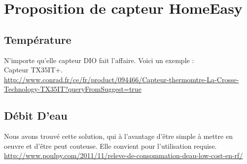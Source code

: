 \documentclass[10pt,a4paper]{article}
\begin{document}
\section{Proposition de capteur HomeEasy}
\subsection{Température}
N'importe qu'elle capteur DIO fait l'affaire. Voici un exemple :\\
Capteur TX35IT+.\\
\url{http://www.conrad.fr/ce/fr/product/094466/Capteur-thermomtre-La-Crosse-Technology-TX35IT?queryFromSuggest=true}
\subsection{Débit D'eau}
Nous avons trouvé cette solution, qui à l'avantage d'être simple à mettre en oeuvre et d'être peut couteuse. Elle convient pour l'utilisation requise.\\
\url{http://www.poulpy.com/2011/11/releve-de-consommation-deau-low-cost-en-rf/}
\end{document}
